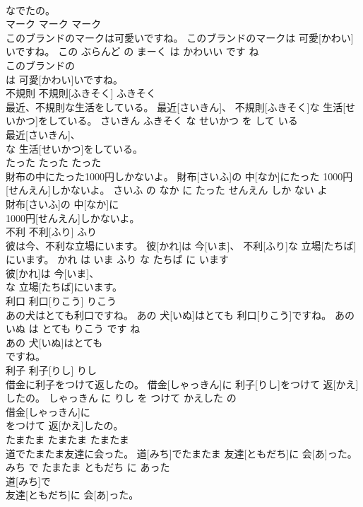 \documentclass[8pt]{extreport}
\begin{document}
\begin{CJK}{UTF8}{min}
\\	なでたの。			
\\	マーク	マーク	マーク	
\\	このブランドのマークは可愛いですね。	このブランドのマークは 可愛[かわい]いですね。	この ぶらんど の まーく は かわいい です ね	
\\	このブランドの
\\	は 可愛[かわい]いですね。			
\\	不規則	不規則[ふきそく]	ふきそく	
\\	最近、不規則な生活をしている。	最近[さいきん]、 不規則[ふきそく]な 生活[せいかつ]をしている。	さいきん ふきそく な せいかつ を して いる	
\\	最近[さいきん]、
\\	な 生活[せいかつ]をしている。			
\\	たった	たった	たった	
\\	財布の中にたった1000円しかないよ。	財布[さいふ]の 中[なか]にたった 1000円[せんえん]しかないよ。	さいふ の なか に たった せんえん しか ない よ	
\\	財布[さいふ]の 中[なか]に
\\	1000円[せんえん]しかないよ。			
\\	不利	不利[ふり]	ふり	
\\	彼は今、不利な立場にいます。	彼[かれ]は 今[いま]、 不利[ふり]な 立場[たちば]にいます。	かれ は いま ふり な たちば に います	
\\	彼[かれ]は 今[いま]、
\\	な 立場[たちば]にいます。			
\\	利口	利口[りこう]	りこう	
\\	あの犬はとても利口ですね。	あの 犬[いぬ]はとても 利口[りこう]ですね。	あの いぬ は とても りこう です ね	
\\	あの 犬[いぬ]はとても
\\	ですね。			
\\	利子	利子[りし]	りし	
\\	借金に利子をつけて返したの。	借金[しゃっきん]に 利子[りし]をつけて 返[かえ]したの。	しゃっきん に りし を つけて かえした の	
\\	借金[しゃっきん]に
\\	をつけて 返[かえ]したの。			
\\	たまたま	たまたま	たまたま	
\\	道でたまたま友達に会った。	道[みち]でたまたま 友達[ともだち]に 会[あ]った。	みち で たまたま ともだち に あった	
\\	道[みち]で
\\	友達[ともだち]に 会[あ]った。			

\end{CJK}
\end{document}
